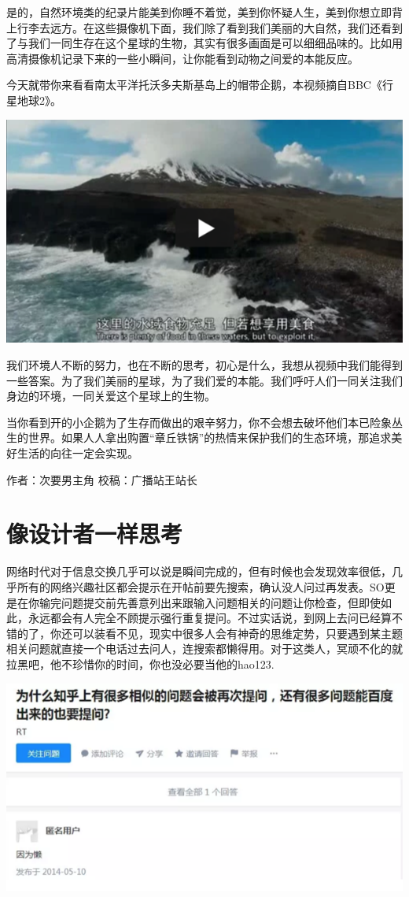 \documentclass[]{book}
\begin{document}
是的，自然环境类的纪录片能美到你睡不着觉，美到你怀疑人生，美到你想立即背上行李去远方。在这些摄像机下面，我们除了看到我们美丽的大自然，我们还看到了与我们一同生存在这个星球的生物，其实有很多画面是可以细细品味的。比如用高清摄像机记录下来的一些小瞬间，让你能看到动物之间爱的本能反应。

今天就带你来看看南太平洋托沃多夫斯基岛上的帽带企鹅，本视频摘自BBC《行星地球2》。

\includegraphics[width=8.33in]{images/xf5}

我们环境人不断的努力，也在不断的思考，初心是什么，我想从视频中我们能得到一些答案。为了我们美丽的星球，为了我们爱的本能。我们呼吁人们一同关注我们身边的环境，一同关爱这个星球上的生物。

当你看到开的小企鹅为了生存而做出的艰辛努力，你不会想去破坏他们本已险象丛生的世界。如果人人拿出购置``章丘铁锅''的热情来保护我们的生态环境，那追求美好生活的向往一定会实现。

作者：次要男主角 校稿：广播站王站长

\section{像设计者一样思考}

网络时代对于信息交换几乎可以说是瞬间完成的，但有时候也会发现效率很低，几乎所有的网络兴趣社区都会提示在开帖前要先搜索，确认没人问过再发表。SO更是在你输完问题提交前先善意列出来跟输入问题相关的问题让你检查，但即使如此，永远都会有人完全不顾提示强行重复提问。不过实话说，到网上去问已经算不错的了，你还可以装看不见，现实中很多人会有神奇的思维定势，只要遇到某主题相关问题就直接一个电话过去问人，连搜索都懒得用。对于这类人，冥顽不化的就拉黑吧，他不珍惜你的时间，你也没必要当他的hao123.

\includegraphics[width=8.33in]{images/sheji1}
\end{document}
